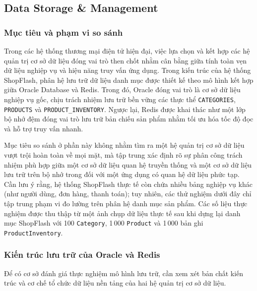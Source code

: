 \subsection{Data Storage \& Management}\label{sec:storage}
\begingroup
\setcounter{table}{0}\setcounter{figure}{0}
\renewcommand{\thetable}{\thesubsection.\arabic{table}}
\renewcommand{\thefigure}{\thesubsection.\arabic{figure}}
\renewcommand{\theHtable}{\thesubsection.\arabic{table}}
\renewcommand{\theHfigure}{\thesubsection.\arabic{figure}}
\subsubsection{Mục tiêu và phạm vi so sánh}

Trong các hệ thống thương mại điện tử hiện đại, việc lựa chọn và kết hợp các hệ quản trị cơ sở dữ liệu đóng vai trò then chốt nhằm cân bằng giữa tính toàn vẹn dữ liệu nghiệp vụ và hiệu năng truy vấn ứng dụng. Trong kiến trúc của hệ thống ShopFlash, phân hệ lưu trữ dữ liệu danh mục được thiết kế theo mô hình kết hợp giữa Oracle Database và Redis. Trong đó, Oracle đóng vai trò là cơ sở dữ liệu nghiệp vụ gốc, chịu trách nhiệm lưu trữ bền vững các thực thể \texttt{CATEGORIES}, \texttt{PRODUCTS} và \texttt{PRODUCT\_INVENTORY}. Ngược lại, Redis được khai thác như một lớp bộ nhớ đệm đóng vai trò lưu trữ bản chiếu sản phẩm nhằm tối ưu hóa tốc độ đọc và hỗ trợ truy vấn nhanh.

Mục tiêu so sánh ở phần này không nhằm tìm ra một hệ quản trị cơ sở dữ liệu vượt trội hoàn toàn về mọi mặt, mà tập trung xác định rõ sự phân công trách nhiệm phù hợp giữa một cơ sở dữ liệu quan hệ truyền thống và một cơ sở dữ liệu lưu trữ trên bộ nhớ trong đối với một ứng dụng có quan hệ dữ liệu phức tạp. Cần lưu ý rằng, hệ thống ShopFlash thực tế còn chứa nhiều bảng nghiệp vụ khác (như người dùng, đơn hàng, thanh toán); tuy nhiên, các thử nghiệm dưới đây chỉ tập trung phạm vi đo lường trên phân hệ danh mục sản phẩm. Các số liệu thực nghiệm được thu thập từ một ảnh chụp dữ liệu thực tế sau khi dựng lại danh mục ShopFlash với 100 \texttt{Category}, 1\,000 \texttt{Product} và 1\,000 bản ghi \texttt{ProductInventory}.

\subsubsection{Kiến trúc lưu trữ của Oracle và Redis}

Để có cơ sở đánh giá thực nghiệm mô hình lưu trữ, cần xem xét bản chất kiến trúc và cơ chế tổ chức dữ liệu nền tảng của hai hệ quản trị cơ sở dữ liệu.

